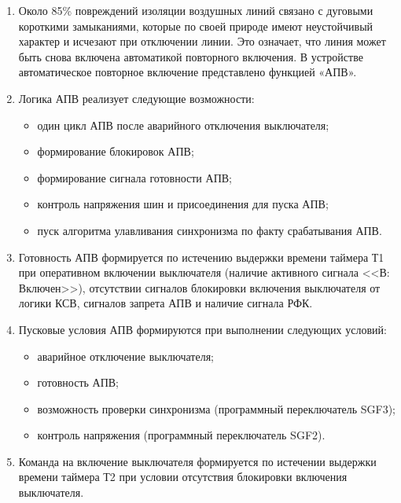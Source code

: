 
\color{black}

\begin{enumerate}

\item
Около 85\% повреждений изоляции воздушных линий связано с дуговыми короткими замыканиями, которые по своей природе имеют неустойчивый характер и исчезают при отключении линии. Это означает, что линия может быть снова включена автоматикой повторного включения. В устройстве автоматическое повторное включение представлено функцией «АПВ».

\item
Логика АПВ реализует следующие возможности:
\begin{itemize}
    \item один цикл АПВ после аварийного отключения выключателя;
    \item формирование блокировок АПВ;
    \item формирование сигнала готовности АПВ;
    \item контроль напряжения шин и присоединения для пуска АПВ;
    \item пуск алгоритма улавливания синхронизма по факту срабатывания АПВ.
\end{itemize}

\item
Готовность АПВ формируется по истечению выдержки времени таймера Т1 при оперативном включении выключателя (наличие активного сигнала <<В: Включен>>), отсутствии сигналов блокировки включения выключателя от логики КСВ, сигналов запрета АПВ и наличие сигнала РФК.

\item
Пусковые условия АПВ формируются при выполнении следующих условий:
\begin{itemize}
    \item аварийное отключение выключателя; 
    \item готовность АПВ; 
    \item возможность проверки синхронизма (программный переключатель SGF3);
    \item контроль напряжения (программный переключатель SGF2).
\end{itemize}

\item
Команда на включение выключателя формируется по истечении выдержки времени таймера Т2 при условии отсутствия блокировки включения выключателя.


\end{enumerate}
